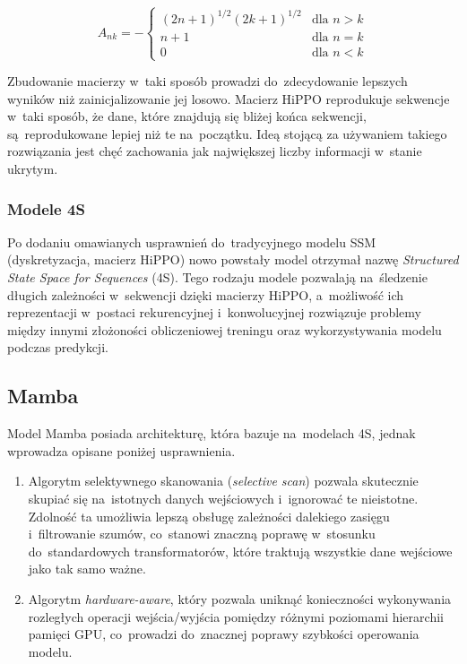 \documentclass[data-science]{agh-wi} %
\begin{document}
\begin{equation}
    A_{nk} = -
    \begin{cases}
        (2n + 1)^{1/2} (2k + 1)^{1/2} & \text{dla } n > k \\
        n + 1                         & \text{dla } n = k \\
        0                             & \text{dla } n < k
    \end{cases}
    \label{equ:hippo_matrix}
\end{equation}

Zbudowanie macierzy w~taki sposób prowadzi do~zdecydowanie lepszych wyników niż zainicjalizowanie jej losowo. Macierz HiPPO reprodukuje sekwencje w~taki sposób, że dane, które znajdują się bliżej końca sekwencji, są~reprodukowane lepiej niż te na~początku. Ideą stojącą za używaniem takiego rozwiązania jest chęć zachowania jak największej liczby informacji w~stanie ukrytym.

\subsubsection*{Modele 4S}
Po dodaniu omawianych usprawnień do~tradycyjnego modelu SSM (dyskretyzacja, macierz HiPPO) nowo powstały model otrzymał nazwę \textit{Structured State Space for Sequences} (4S). Tego rodzaju modele pozwalają na~śledzenie długich zależności w~sekwencji dzięki macierzy HiPPO, a~możliwość ich reprezentacji w~postaci rekurencyjnej i~konwolucyjnej rozwiązuje problemy między innymi złożoności obliczeniowej treningu oraz wykorzystywania modelu podczas predykcji.

\subsection{Mamba}
Model Mamba posiada architekturę, która bazuje na~modelach 4S, jednak wprowadza opisane poniżej usprawnienia.
\begin{enumerate}
    \item Algorytm selektywnego skanowania (\textit{selective scan}) pozwala skutecznie skupiać się na~istotnych danych wejściowych i~ignorować te nieistotne. Zdolność ta umożliwia lepszą obsługę zależności dalekiego zasięgu i~filtrowanie szumów, co~stanowi znaczną poprawę w~stosunku do~standardowych transformatorów, które traktują wszystkie dane wejściowe jako tak samo ważne.
    \item Algorytm \textit{hardware-aware}, który pozwala uniknąć konieczności wykonywania rozległych operacji wejścia/wyjścia pomiędzy różnymi poziomami hierarchii pamięci GPU, co~prowadzi do~znacznej poprawy szybkości operowania modelu.
\end{enumerate}
\end{document}
